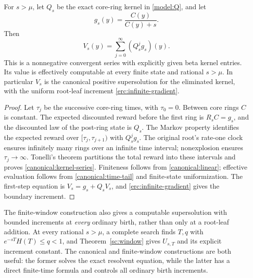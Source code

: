 \begin{proposition}
\label{canonical:series}
For $s>\mu$, let $Q_s$ be the exact core-ring kernel in
\eqref{model:Q}, and let
\[
 g_s(y)=\frac{C(y)}{C(y)+s}.
\]
Then
\begin{equation}\label{canonical:kernel-series}
 V_s(y)=\sum_{j=0}^\infty(Q_s^jg_s)(y).
\end{equation}
This is a nonnegative convergent series with explicitly given beta
kernel entries. Its value is effectively computable at every finite
state and rational $s>\mu$. In particular $V_s$ is the canonical
positive supersolution for the eliminated kernel, with the uniform
root-leaf increment \eqref{erc:infinite-gradient}.
\end{proposition}
\begin{proof}
Let $\tau_j$ be the successive core-ring times, with $\tau_0=0$.
Between core rings $C$ is constant. The expected discounted reward
before the first ring is $R_sC=g_s$, and the discounted law of the
post-ring state is $Q_s$. The Markov property identifies the expected
reward over $[\tau_j,\tau_{j+1})$ with $Q_s^jg_s$. The original
root's rate-one clock ensures infinitely many rings over an infinite
time interval; nonexplosion ensures $\tau_j\to\infty$. Tonelli's
theorem partitions the total reward into these intervals and proves
\eqref{canonical:kernel-series}. Finiteness follows from
\eqref{canonical:linear}; effective evaluation follows from
\eqref{canonical:time-tail} and finite-state uniformization. The
first-step equation is $V_s=g_s+Q_sV_s$, and
\eqref{erc:infinite-gradient} gives the boundary increment.
\end{proof}

The finite-window construction also gives a computable supersolution
with bounded increments at \emph{every} ordinary birth, rather than
only at a root-leaf addition. At every rational $s>\mu$, a complete
search finds $T,q$ with $e^{-sT}H(T)\le q<1$, and
Theorem~\ref{sc:window} gives $U_{s,T}$ and its explicit increment
constant. The canonical and finite-window constructions are both
useful: the former solves the exact resolvent equation, while the
latter has a direct finite-time formula and controls all ordinary
birth increments.
